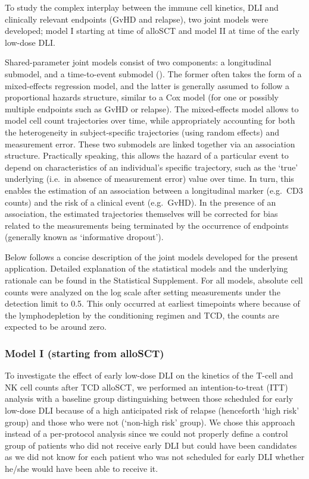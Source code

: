\documentclass[
  letterpaper,
  paper=240mm:170mm,
  twoside=true,
  open=right,
  fontsize=10pt,
  pagesize=false,
  BCOR=15mm,
  DIV=14,
  headinclude=true,
  footinclude=false,
  headsepline=on]{scrbook}
\begin{document}
To study the complex interplay between the immune cell kinetics, DLI and
clinically relevant endpoints (GvHD and relapse), two joint models were
developed; model I starting at time of alloSCT and model II at time of
the early low-dose DLI.

Shared-parameter joint models consist of two components: a longitudinal
submodel, and a time-to-event submodel
(). The former often takes the form of a mixed-effects regression
model, and the latter is generally assumed to follow a proportional
hazards structure, similar to a Cox model (for one or possibly multiple
endpoints such as GvHD or relapse). The mixed-effects model allows to
model cell count trajectories over time, while appropriately accounting
for both the heterogeneity in subject-specific trajectories (using
random effects) and measurement error. These two submodels are linked
together via an association structure. Practically speaking, this allows
the hazard of a particular event to depend on characteristics of an
individual's specific trajectory, such as the `true' underlying (i.e.~in
absence of measurement error) value over time. In turn, this enables the
estimation of an association between a longitudinal marker (e.g.~CD3
counts) and the risk of a clinical event (e.g.~GvHD). In the presence of
an association, the estimated trajectories themselves will be corrected
for bias related to the measurements being terminated by the occurrence
of endpoints (generally known as `informative dropout').

Below follows a concise description of the joint models developed for
the present application. Detailed explanation of the statistical models
and the underlying rationale can be found in the Statistical Supplement.
For all models, absolute cell counts were analyzed on the log scale
after setting measurements under the detection limit to 0.5. This only
occurred at earliest timepoints where because of the lymphodepletion by
the conditioning regimen and TCD, the counts are expected to be around
zero.

\subsubsection{Model I (starting from
alloSCT)}\label{model-i-starting-from-allosct}

To investigate the effect of early low-dose DLI on the kinetics of the
T-cell and NK cell counts after TCD alloSCT, we performed an
intention-to-treat (ITT) analysis with a baseline group distinguishing
between those scheduled for early low-dose DLI because of a high
anticipated risk of relapse (henceforth `high risk' group) and those who
were not (`non-high risk' group). We chose this approach instead of a
per-protocol analysis since we could not properly define a control group
of patients who did not receive early DLI but could have been candidates
as we did not know for each patient who was not scheduled for early DLI
whether he/she would have been able to receive it.
\end{document}

